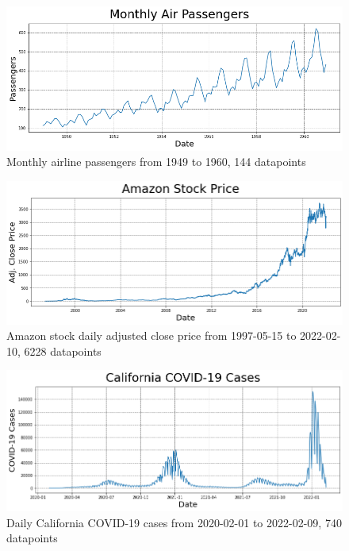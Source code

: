 \documentclass[conference]{IEEEtran}
\begin{document}
\begin{figure}
\begin{center}
\includegraphics[scale=0.42]{AirPassengers_time_series.png}
\caption{Monthly airline passengers from 1949 to 1960, 144 datapoints}
\label{fig:AirPassengers_time_series}
\end{center}
\end{figure}

\begin{figure}
\begin{center}
\includegraphics[scale=0.42]{AMZN_time_series.png}
\caption{Amazon stock daily adjusted close price from 1997-05-15 to 2022-02-10, 6228 datapoints}
\label{fig:}
\end{center}
\end{figure}

\begin{figure}
\begin{center}
\includegraphics[scale=0.42]{CA_COVID19_time_series.png}
\caption{Daily California COVID-19 cases from 2020-02-01 to 2022-02-09, 740 datapoints}
\label{fig:CA_COVID19_time_series}
\end{center}
\end{figure}
\end{document}
